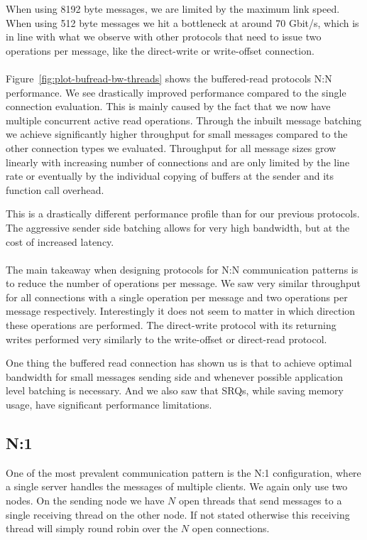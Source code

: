 When using 8192 byte messages, we are limited by the maximum link speed. When using 512 byte messages we hit a bottleneck at
around 70 Gbit/s, which is in line with what we observe with other protocols that need to issue two operations per message, 
like the direct-write or write-offset connection.



\paragraph{} Figure~\ref{fig:plot-bufread-bw-threads} shows the buffered-read protocols N:N performance. We see drastically 
improved performance compared to the single connection evaluation. This is mainly caused by the fact that we now have multiple
concurrent active read operations. Through the inbuilt message batching we achieve  significantly higher throughput for small
messages compared to the other connection types we evaluated. Throughput for all message sizes grow linearly with increasing 
number of connections and are only limited by the line rate or eventually by the individual copying of buffers at the sender 
and its function call overhead.

This is a drastically different performance profile than for our previous protocols. The aggressive sender side batching allows
for very high bandwidth, but at the cost of increased latency.


\paragraph{} The main takeaway when designing protocols for N:N communication patterns is to reduce the number of operations
per message. We saw very similar throughput for all connections with a single operation per message and two operations per
message respectively. Interestingly it does not seem to matter in which direction these operations are performed. The 
direct-write protocol with its returning writes performed very similarly to the write-offset or direct-read protocol.

One thing the buffered read connection has shown us is that to achieve optimal bandwidth for small messages sending side and
whenever possible application level batching is necessary. And we also saw that SRQs, while saving memory usage, have 
significant performance limitations.



\pagebreak
\subsection{N:1}
One of the most prevalent communication pattern is the N:1 configuration, where a single server handles the messages
of multiple clients. We again only use two nodes. On the sending node we have $N$ open threads that send messages to a
single receiving thread on the other node. If not stated otherwise this receiving thread will simply 
round robin over the $N$ open connections. 

